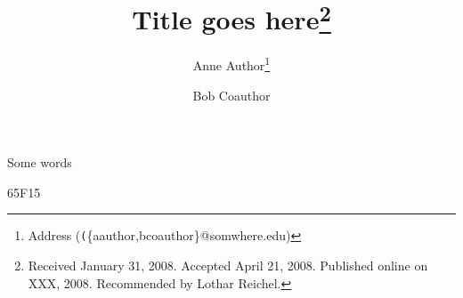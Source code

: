 \documentclass[final]{siamltex}
\title{Title goes here\thanks{
    Received January 31, 2008.
    Accepted April 21, 2008.
    Published online on XXX, 2008.
    Recommended by Lothar Reichel.
}}
\author{Anne Author\thanks{Address 
    (\texttt(\{aauthor,bcoauthor\}@somwhere.edu)}
  \and Bob Coauthor\footnotemark[2]}
\begin{document}
\maketitle


\begin{abstract}
\end{abstract}

\begin{keywords}
Some words
\end{keywords}

\begin{AMS}
65F15
\end{AMS}

\pagestyle{myheadings}
\thispagestyle{plain} 




\end{document}
